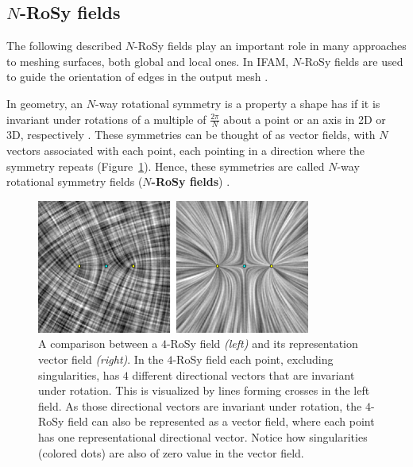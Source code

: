 \documentclass{ACGSeminar}
\begin{document}
\subsection{$N$-RoSy fields}\label{rosy}
The following described $N$-RoSy fields play an important role in many approaches to meshing surfaces, both global and local ones. In IFAM, $N$-RoSy fields are used to guide the orientation of edges in the output mesh \cite{jakob2015instant}.

In geometry, an $N$-way rotational symmetry is a property a shape has if it is invariant under rotations of a multiple of $\frac{2\pi}{N}$ about a point or an axis in 2D or 3D, respectively \cite{palacios2007rotational}. These symmetries can be thought of as vector fields, with $N$ vectors associated with each point, each pointing in a direction where the symmetry repeats (Figure~\ref{fig:n-rosy-singularities}). Hence, these symmetries are called $N$-way rotational symmetry fields (\textbf{$N$-RoSy fields}) \cite{panozzo2012fields}.

\begin{figure}[htb!]
	\begin{centering}
		\includegraphics[width=9cm]{img/n-Rosy-Singularity.png}\par
	\end{centering}
	\caption{A comparison between a $4$-RoSy field \textit{(left)} and its representation vector field \textit{(right)}. In the $4$-RoSy field each point, excluding singularities, has $4$ different directional vectors that are invariant under rotation. This is visualized by lines forming crosses in the left field. As those directional vectors are invariant under rotation, the $4$-RoSy field can also be represented as a vector field, where each point has one representational directional vector. Notice how singularities (colored dots) are also of zero value in the vector field. \cite{palacios2007rotational}}
	\label{fig:n-rosy-singularities}
\end{figure}
\end{document}
